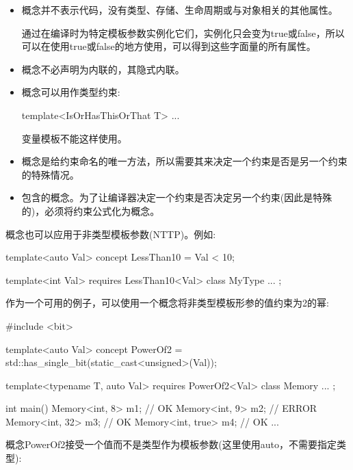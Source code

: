 \begin{itemize}
\item
概念并不表示代码，没有类型、存储、生命周期或与对象相关的其他属性。

通过在编译时为特定模板参数实例化它们，实例化只会变为true或false，所以可以在使用true或false的地方使用，可以得到这些字面量的所有属性。

\item
概念不必声明为内联的，其隐式内联。

\item
概念可以用作类型约束:

\begin{cpp}
template<IsOrHasThisOrThat T>
...
\end{cpp}

变量模板不能这样使用。

\item
概念是给约束命名的唯一方法，所以需要其来决定一个约束是否是另一个约束的特殊情况。

\item
包含的概念。为了让编译器决定一个约束是否决定另一个约束(因此是特殊的)，必须将约束公式化为概念。
\end{itemize}


概念也可以应用于非类型模板参数(NTTP)。例如:

\begin{cpp}
template<auto Val>
concept LessThan10 = Val < 10;

template<int Val>
requires LessThan10<Val>
class MyType {
	...
};
\end{cpp}

作为一个可用的例子，可以使用一个概念将非类型模板形参的值约束为2的幂:


\begin{cpp}
#include <bit>

template<auto Val>
concept PowerOf2 = std::has_single_bit(static_cast<unsigned>(Val));

template<typename T, auto Val>
requires PowerOf2<Val>
class Memory {
	...
};

int main()
{
	Memory<int, 8> m1; // OK
	Memory<int, 9> m2; // ERROR
	Memory<int, 32> m3; // OK
	Memory<int, true> m4; // OK
	...
}
\end{cpp}

概念PowerOf2接受一个值而不是类型作为模板参数(这里使用auto，不需要指定类型):

